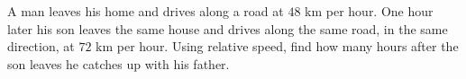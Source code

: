 A man leaves his home and drives along a road at $48$ km per hour. One hour later his son leaves the same house and drives along the same road, in the same direction, at $72$ km per hour. Using relative speed, find how many hours after the son leaves he catches up with his father.
